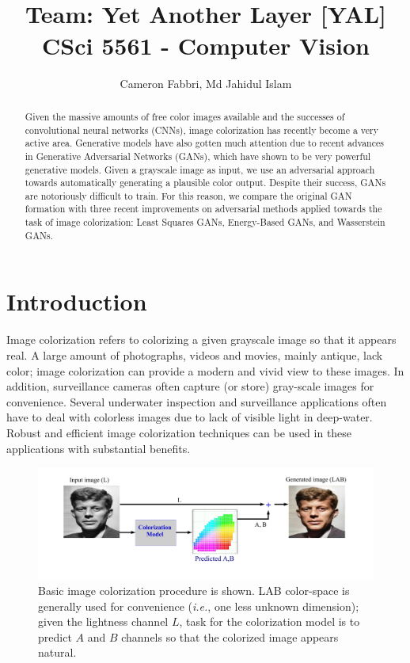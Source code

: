 \documentclass[10pt]{article}
\title{\textbf{\doctitle}\\
\small {Team: Yet Another Layer [YAL]} \\
\small CSci 5561 - Computer Vision }
\author{Cameron Fabbri, Md Jahidul Islam}
\date{}
\begin{document}
\maketitle

\begin{abstract}
Given the massive amounts of free color images available and the successes of convolutional neural networks (CNNs),
image colorization has recently become a very active area. Generative models have also gotten much attention due to
recent advances in Generative Adversarial Networks (GANs), which have shown to be very powerful generative models.
Given a grayscale image as input, we use an adversarial approach towards automatically generating a plausible color
output. Despite their success, GANs are notoriously difficult to train. For this reason, we compare the original GAN
formation with three recent improvements on adversarial methods applied towards the task of image colorization:
Least Squares GANs, Energy-Based GANs, and Wasserstein GANs.
\end{abstract}

\section{Introduction}\label{sec:intro}
Image colorization \cite{zhang2016colorful, cheng2015deep, bugeau2014variational} refers to colorizing a given grayscale image so that it appears real. 
A large amount of photographs, videos and movies, mainly antique, lack color; image colorization can provide a modern and vivid view to these images. In addition, surveillance cameras often capture (or store) gray-scale images for convenience. Several underwater inspection and surveillance applications \cite{lu2013underwater, torres2005color} often have to deal with colorless images due to lack of visible light in deep-water. Robust and efficient image colorization techniques can be used in these applications with substantial benefits.   

\begin{figure}[h]
\vspace{-3mm}
\includegraphics[width=\linewidth]{Figs/6.pdf}
\vspace{-13mm}
\caption{Basic image colorization procedure is shown. LAB color-space is generally used for convenience (\textit{i.e.}, one less unknown dimension);
given the lightness channel $L$, task for the colorization model is to predict $A$ and $B$ channels so that the colorized image appears natural. }
\label{fig:col}
\end{figure}  
\end{document}
